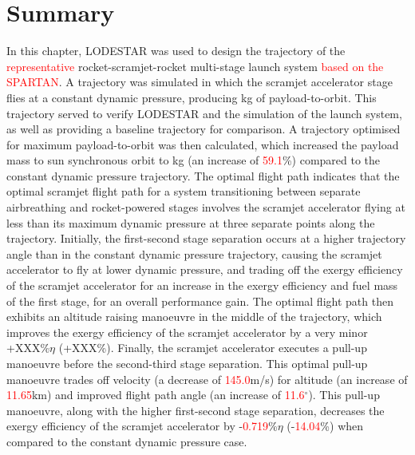 \section{Summary}


In this chapter, LODESTAR was used to design the trajectory of the \textcolor{red}{representative} rocket-scramjet-rocket multi-stage launch system \textcolor{red}{based on the SPARTAN}. 
A trajectory was simulated in which the scramjet accelerator stage flies at a constant dynamic pressure, producing \PayloadToOrbitConstqNoReturn kg of payload-to-orbit. This trajectory served to verify LODESTAR and the simulation of  the launch system, as well as providing a baseline trajectory for comparison. 
A trajectory optimised for maximum payload-to-orbit was then calculated, which increased the payload mass to sun synchronous orbit to \PayloadToOrbitStandardNoReturn kg (an increase of \textcolor{red}{59.1}\%) compared to the constant dynamic pressure trajectory.
  The optimal flight path indicates that the optimal scramjet flight path for a system transitioning between separate airbreathing and rocket-powered stages involves the scramjet accelerator flying at less than its maximum dynamic pressure at three separate points along the trajectory. 
  Initially, the first-second stage separation occurs at a higher trajectory angle than in the constant dynamic pressure trajectory, causing the scramjet accelerator to fly at lower dynamic pressure, and trading off the exergy efficiency of the scramjet accelerator for an increase in the exergy efficiency and fuel mass of the first stage, for an overall performance gain. 
  The optimal flight path then exhibits an altitude raising manoeuvre in the middle of the trajectory, which improves the exergy efficiency of the scramjet accelerator by a very minor +XXX\%$\eta$ (+XXX\%). 
  Finally, the scramjet accelerator executes a pull-up manoeuvre before the second-third stage separation. This optimal pull-up manoeuvre trades off velocity (a decrease of \textcolor{red}{145.0}m/s) for altitude (an increase of \textcolor{red}{11.65}km) and improved flight path angle (an increase of \textcolor{red}{11.6}$^\circ$). This pull-up manoeuvre, along with the higher first-second stage separation, decreases the exergy efficiency of the scramjet accelerator by -\textcolor{red}{0.719}\%$\eta$ (-\textcolor{red}{14.04}\%) when compared to the constant dynamic pressure case. 
